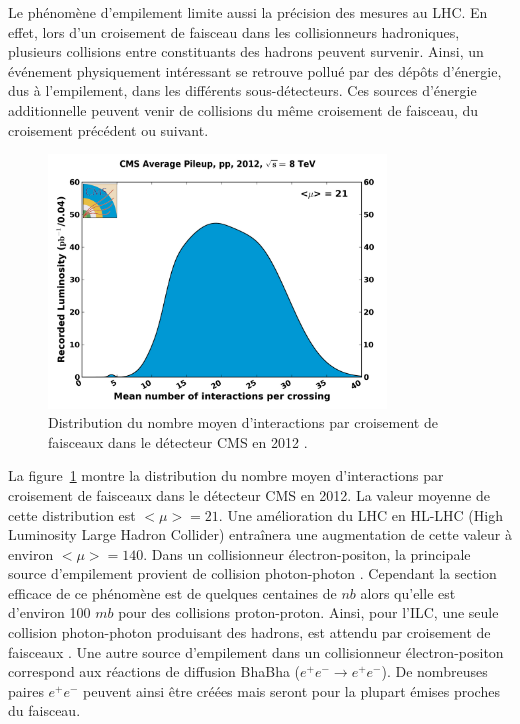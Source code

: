 Le phénomène d'empilement limite aussi la précision des mesures au LHC. En effet, lors d'un croisement de faisceau dans les collisionneurs hadroniques, plusieurs collisions entre constituants des hadrons peuvent survenir. Ainsi, un événement physiquement intéressant se retrouve pollué par des dépôts d'énergie, dus à l'empilement, dans les différents sous-détecteurs. Ces sources d'énergie additionnelle peuvent venir de collisions du même croisement de faisceau, du croisement précédent ou suivant. 

\begin{figure}[!ht]
  \begin{center}
    \includegraphics[width=0.8\textwidth]{ILC/figs/pileup_pp_2012.png}
    \caption{Distribution du nombre moyen d'interactions par croisement de faisceaux dans le détecteur CMS en 2012 \cite{cmslumiplot}.}
    \label{fig:cms-pileup}
  \end{center}
\end{figure}
La figure~\ref{fig:cms-pileup} montre la distribution du nombre moyen d'interactions par croisement de faisceaux dans le détecteur CMS en 2012. La valeur moyenne de cette distribution est $<\mu>=21$. Une amélioration du LHC en HL-LHC (High Luminosity Large Hadron Collider) entraînera une augmentation de cette valeur à environ $<\mu>=140$. Dans un collisionneur électron-positon, la principale source d’empilement provient de collision photon-photon \cite{physicsTDR}. Cependant la section efficace de ce phénomène est de quelques centaines de $nb$ alors qu'elle est d'environ 100 $mb$ pour des collisions proton-proton. Ainsi, pour l'ILC, une seule collision photon-photon produisant des hadrons, est attendu par croisement de faisceaux \cite{physicsTDR}. Une autre source d'empilement dans un collisionneur électron-positon correspond aux réactions de diffusion BhaBha ($e^+e^-\rightarrow e^+e^-$). De nombreuses paires $e^+e^-$ peuvent ainsi être créées mais seront pour la plupart émises proches du faisceau. 

